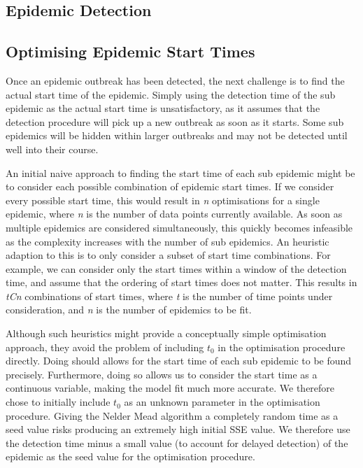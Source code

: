 \subsection{Epidemic Detection}

\subsection{Optimising Epidemic Start Times}
Once an epidemic outbreak has been detected, the next challenge is to
find the actual start time of the epidemic. Simply using the detection
time of the sub epidemic as the actual start time is unsatisfactory,
as it assumes that the detection procedure will pick up a new outbreak
as soon as it starts. Some sub epidemics will be hidden within larger
outbreaks and may not be detected until well into their course. 

An initial naive approach to finding the start time of each sub
epidemic might be to consider each possible combination of epidemic
start times. If we consider every possible start time, this would
result in \emph{n}
optimisations for a single epidemic, where \emph{n} is the number of
data points currently available. As soon as multiple epidemics are
considered simultaneously, this quickly becomes infeasible as the
complexity increases with the number of sub epidemics. An heuristic adaption to this is to only consider a subset of start
time combinations. For example, we can consider only the start times
within a window of the detection time, and assume that the ordering of
start times does not matter. This results in \emph{tCn} combinations
of start times, where \emph{t} is the number of time points under
consideration, and \emph{n} is the number of epidemics to be
fit. 

Although such heuristics  might provide a
conceptually simple optimisation approach, they avoid the problem of
including $t_0$ in the optimisation procedure directly. Doing should
allows for the start time of each sub epidemic to be found
precisely. Furthermore, doing so allows us to consider the start time
as a continuous variable, making the model fit much more accurate. We
therefore chose to initially include $t_0$ as an unknown parameter in
the optimisation procedure. Giving the Nelder Mead algorithm a
completely random time as a seed value risks producing an extremely
high initial SSE value. We therefore use the detection time minus a
small value (to account for delayed detection) of the epidemic
as the seed value for the optimisation procedure. 

